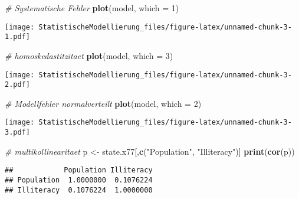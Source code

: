 \documentclass[
]{article}
\newenvironment{Shaded}{\begin{snugshade}}{\end{snugshade}}
\newcommand{\AttributeTok}[1]{\textcolor[rgb]{0.13,0.29,0.53}{#1}}
\newcommand{\CommentTok}[1]{\textcolor[rgb]{0.56,0.35,0.01}{\textit{#1}}}
\newcommand{\DecValTok}[1]{\textcolor[rgb]{0.00,0.00,0.81}{#1}}
\newcommand{\FunctionTok}[1]{\textcolor[rgb]{0.13,0.29,0.53}{\textbf{#1}}}
\newcommand{\NormalTok}[1]{#1}
\newcommand{\OtherTok}[1]{\textcolor[rgb]{0.56,0.35,0.01}{#1}}
\newcommand{\StringTok}[1]{\textcolor[rgb]{0.31,0.60,0.02}{#1}}
\begin{document}
\begin{Shaded}
\begin{Highlighting}[]
\CommentTok{\# Systematische Fehler}
\FunctionTok{plot}\NormalTok{(model, }\AttributeTok{which =} \DecValTok{1}\NormalTok{)}
\end{Highlighting}
\end{Shaded}

\texttt{[image: StatistischeModellierung\_files/figure-latex/unnamed-chunk-3-1.pdf]}

\begin{Shaded}
\begin{Highlighting}[]
\CommentTok{\# homoskedastitzitaet}
\FunctionTok{plot}\NormalTok{(model, }\AttributeTok{which =} \DecValTok{3}\NormalTok{)}
\end{Highlighting}
\end{Shaded}

\texttt{[image: StatistischeModellierung\_files/figure-latex/unnamed-chunk-3-2.pdf]}

\begin{Shaded}
\begin{Highlighting}[]
\CommentTok{\# Modellfehler normalverteilt}
\FunctionTok{plot}\NormalTok{(model, }\AttributeTok{which =} \DecValTok{2}\NormalTok{)}
\end{Highlighting}
\end{Shaded}

\texttt{[image: StatistischeModellierung\_files/figure-latex/unnamed-chunk-3-3.pdf]}

\begin{Shaded}
\begin{Highlighting}[]
\CommentTok{\# multikollinearitaet}
\NormalTok{p }\OtherTok{\textless{}{-}}\NormalTok{ state.x77[,}\FunctionTok{c}\NormalTok{(}\StringTok{"Population"}\NormalTok{, }\StringTok{"Illiteracy"}\NormalTok{)]}
\FunctionTok{print}\NormalTok{(}\FunctionTok{cor}\NormalTok{(p))}
\end{Highlighting}
\end{Shaded}

\begin{verbatim}
##            Population Illiteracy
## Population  1.0000000  0.1076224
## Illiteracy  0.1076224  1.0000000
\end{verbatim}
\end{document}
